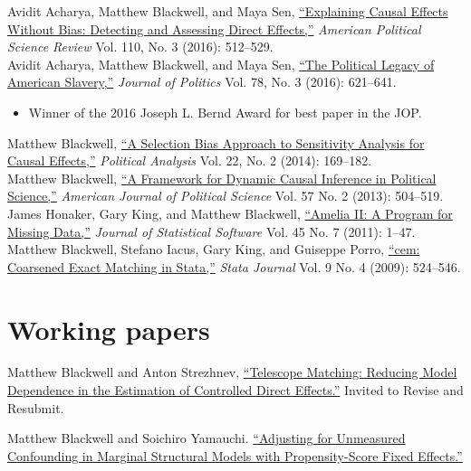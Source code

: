 \documentclass[margin,line,12pt]{res}
\begin{document}
\begin{resume}
Avidit Acharya, Matthew Blackwell, and Maya Sen, \href{http://www.mattblackwell.org/files/papers/direct-effects.pdf}{``Explaining Causal Effects Without Bias: Detecting and Assessing Direct Effects,''} \emph{American Political Science Review } Vol. 110, No. 3 (2016): 512--529.\vspace{1em}\\
Avidit Acharya, Matthew Blackwell, and Maya Sen, \href{http://www.mattblackwell.org/files/papers/slavery.pdf}{``The Political Legacy of American Slavery,''}   \emph{Journal of Politics }Vol. 78, No. 3 (2016): 621--641.
\begin{itemize}
\item Winner of the 2016 Joseph L. Bernd Award for best paper in the JOP.\end{itemize}
Matthew Blackwell, \href{http://gking.harvard.edu/files/sens.pdf}{``A Selection Bias Approach to Sensitivity
Analysis for Causal Effects,''} \emph{Political Analysis} Vol. 22, No. 2 (2014): 169--182.\vspace{1em}\\
Matthew Blackwell,
\href{http://mattblackwell.org/files/papers/dynci.pdf}{``A Framework
  for Dynamic Causal Inference in Political Science,''}
\emph{American Journal of Political Science} Vol. 57 No. 2 (2013): 504--519.\vspace{1em}\\
James Honaker, Gary King, and Matthew Blackwell, \href{http://www.mattblackwell.org/files/papers/amelia-jss.pdf}{``Amelia II: A
Program for Missing Data,''} \emph{Journal of Statistical Software}
Vol. 45 No. 7 (2011): 1--47.
\vspace{1em}\\
Matthew Blackwell, Stefano Iacus, Gary King, and Guiseppe Porro, \href{http://www.mattblackwell.org/files/papers/cemStata.pdf}{``cem: Coarsened Exact Matching in Stata,''} \emph{Stata
  Journal} Vol. 9 No. 4 (2009): 524--546. 

\section{\sc Working papers}


Matthew Blackwell and Anton Strezhnev, \href{https://mattblackwell.org/files/papers/telescope_matching.pdf}{``Telescope Matching: Reducing Model Dependence in the Estimation of Controlled Direct Effects.''} Invited to Revise and Resubmit. 

Matthew Blackwell and Soichiro Yamauchi. \href{https://mattblackwell.org/files/papers/psfe.pdf}{``Adjusting for Unmeasured Confounding in Marginal Structural Models with Propensity-Score Fixed Effects.''}



\end{resume}
\end{document}
